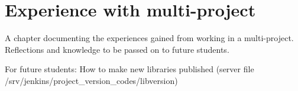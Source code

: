 \chapter{Experience with multi-project}%
A chapter documenting the experiences gained from working in a multi-project. Reflections
and knowledge to be passed on to future students.


For future students: How to make new libraries published (server file /srv/jenkins/project\_version\_codes/libversion)